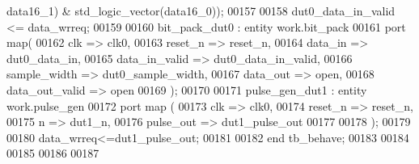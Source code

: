 \begin{DoxyCode}
{      data16_1}\textcolor{vhdlchar}{)} \textcolor{vhdlchar}{&} \textcolor{comment}{std\_logic\_vector}\textcolor{vhdlchar}{(}\textcolor{vhdlchar}{data16_0}\textcolor{vhdlchar}{)}\textcolor{vhdlchar}{)}; 
00157   
00158   \textcolor{vhdlchar}{dut0_data_in_valid} \textcolor{vhdlchar}{<=} \textcolor{vhdlchar}{data_wrreq};
00159   
00160   bit\_pack\_dut0 : \textcolor{keywordflow}{entity} work.bit_pack 
00161 \textcolor{keywordflow}{port} \textcolor{keywordflow}{map}(
00162         clk             => clk0,
00163         reset_n         => reset_n,
00164         data_in         => dut0_data_in,
00165         data_in_valid   => dut0_data_in_valid,
00166         sample_width    => dut0_sample_width,
00167         data_out        => \textcolor{keywordflow}{open},
00168         data_out_valid  => \textcolor{keywordflow}{open}
00169 \textcolor{vhdlchar}{)};  
00170 
00171 pulse\_gen\_dut1 : \textcolor{keywordflow}{entity} work.pulse_gen
00172 \textcolor{keywordflow}{port} \textcolor{keywordflow}{map} (
00173          clk         => clk0,
00174          reset_n     => reset_n,
00175          n           => dut1_n, 
00176          pulse\_out   => dut1_pulse_out
00177                
00178 \textcolor{vhdlchar}{)};
00179 
00180 \textcolor{vhdlchar}{data_wrreq}\textcolor{vhdlchar}{<=}\textcolor{vhdlchar}{dut1_pulse_out};
00181 
00182 \textcolor{keywordflow}{end} \textcolor{vhdlchar}{tb\_behave};
00183   
00184   
00185 
00186 
00187   
\end{DoxyCode}
